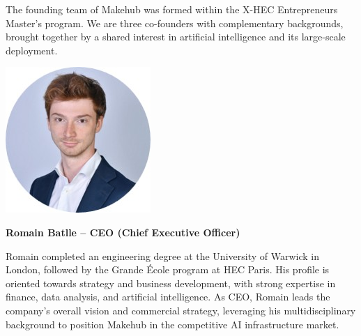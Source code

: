 \documentclass[english]{article}
\begin{document}
The founding team of Makehub was formed within the X-HEC Entrepreneurs Master's program.
We are three co-founders with complementary backgrounds, brought together by a shared interest in artificial intelligence and its large-scale deployment.

\vspace{1.5em}

\noindent
\begin{minipage}[c]{0.2\textwidth}
    \centering
    \includegraphics[width=0.9\linewidth]{images/romain.jpg}
\end{minipage}%
\hfill
\begin{minipage}[c]{0.75\textwidth}
    \textbf{\large Romain Batlle – CEO (Chief Executive Officer)}
    \vspace{0.3em}

    \noindent Romain completed an engineering degree at the University of Warwick in London, followed by the Grande École program at HEC Paris.
    His profile is oriented towards strategy and business development, with strong expertise in finance, data analysis, and artificial intelligence.
    As CEO, Romain leads the company's overall vision and commercial strategy, leveraging his multidisciplinary background to position Makehub in the competitive AI infrastructure market.
\end{minipage}

\vspace{1.5em}
\end{document}
